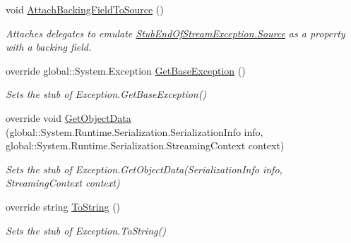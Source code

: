 \begin{DoxyCompactItemize}
void \hyperlink{class_system_1_1_i_o_1_1_fakes_1_1_stub_end_of_stream_exception_a84f514396f3a09bc2b502a37c1894262}{Attach\-Backing\-Field\-To\-Source} ()
\begin{DoxyCompactList}\small\item\em Attaches delegates to emulate \hyperlink{class_system_1_1_i_o_1_1_fakes_1_1_stub_end_of_stream_exception_a346e51ee621b2a01c0fef91ebe0d21a0}{Stub\-End\-Of\-Stream\-Exception.\-Source} as a property with a backing field.\end{DoxyCompactList}\item 
override global\-::\-System.\-Exception \hyperlink{class_system_1_1_i_o_1_1_fakes_1_1_stub_end_of_stream_exception_ad0a1b31649adbdf4457b024c4c539e74}{Get\-Base\-Exception} ()
\begin{DoxyCompactList}\small\item\em Sets the stub of Exception.\-Get\-Base\-Exception()\end{DoxyCompactList}\item 
override void \hyperlink{class_system_1_1_i_o_1_1_fakes_1_1_stub_end_of_stream_exception_a47de92bfb05761da2a71d3b04bc0c3f9}{Get\-Object\-Data} (global\-::\-System.\-Runtime.\-Serialization.\-Serialization\-Info info, global\-::\-System.\-Runtime.\-Serialization.\-Streaming\-Context context)
\begin{DoxyCompactList}\small\item\em Sets the stub of Exception.\-Get\-Object\-Data(\-Serialization\-Info info, Streaming\-Context context)\end{DoxyCompactList}\item 
override string \hyperlink{class_system_1_1_i_o_1_1_fakes_1_1_stub_end_of_stream_exception_af4d699fbed8095b4d595ad09abad3fd6}{To\-String} ()
\begin{DoxyCompactList}\small\item\em Sets the stub of Exception.\-To\-String()\end{DoxyCompactList}\end{DoxyCompactItemize}
